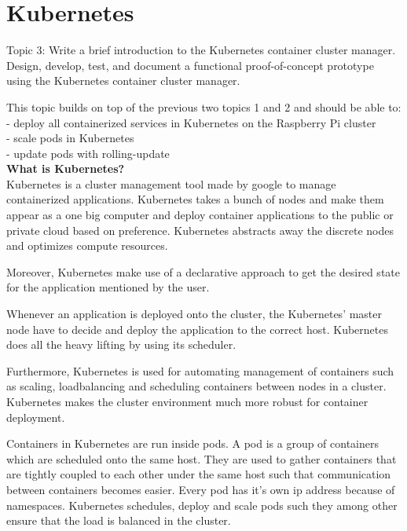 \chapter{Kubernetes}\label{ch:kubernetes}
Topic 3: Write a brief introduction to the Kubernetes container cluster manager. 
Design, develop, test, and document a functional proof-of-concept prototype using the Kubernetes container cluster manager. 

This topic builds on top of the previous two topics 1 and 2 and should be able to:\\
- deploy all containerized services in Kubernetes on the Raspberry Pi cluster \\
- scale pods in Kubernetes \\
- update pods with rolling-update \\

\textbf{What is Kubernetes?}\\

Kubernetes is a cluster management tool made by google to manage containerized applications. Kubernetes takes a bunch of nodes and make them appear as a one big computer and deploy container applications to the public or private cloud based on preference. Kubernetes abstracts away the discrete nodes and optimizes compute resources.  

Moreover, Kubernetes make use of a declarative approach to get the desired state for the application mentioned by the user. 

Whenever an application is deployed onto the cluster, the Kubernetes' master node have to decide and deploy the application to the correct host. Kubernetes does all the heavy lifting by using its scheduler. 

Furthermore, Kubernetes is used for automating management of containers such as scaling, loadbalancing and scheduling containers between nodes in a cluster. Kubernetes makes the cluster environment much more robust for container deployment.

Containers in Kubernetes are run inside pods. A pod is a group of containers which are scheduled onto the same host. They are used to gather containers that are tightly coupled to each other under the same host such that communication between containers becomes easier. Every pod has it's own ip address because of namespaces. Kubernetes schedules, deploy and scale pods such they among other ensure that the load is balanced in the cluster. 

